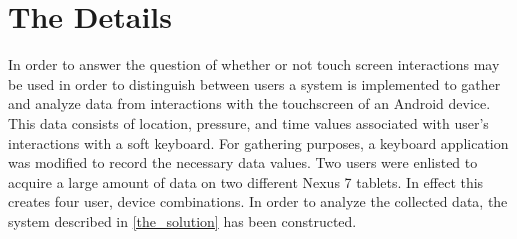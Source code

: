 \section{The Details}
\label{the_details}


In order to answer the question of
whether or not touch screen interactions may be used
in order to distinguish between users
a system is implemented to gather and analyze data
from interactions with the touchscreen of an Android device.
This data consists of location, pressure, and time
values associated with user's interactions with a soft keyboard.
%
For gathering purposes,
a keyboard application was modified to record
the necessary data values.
%
Two users were enlisted to acquire a large 
amount of data on two different Nexus 7 tablets.
In effect this creates four user, device combinations.
%
In order to analyze the collected data,
the system described in \ref{the_solution}
has been constructed.




%


